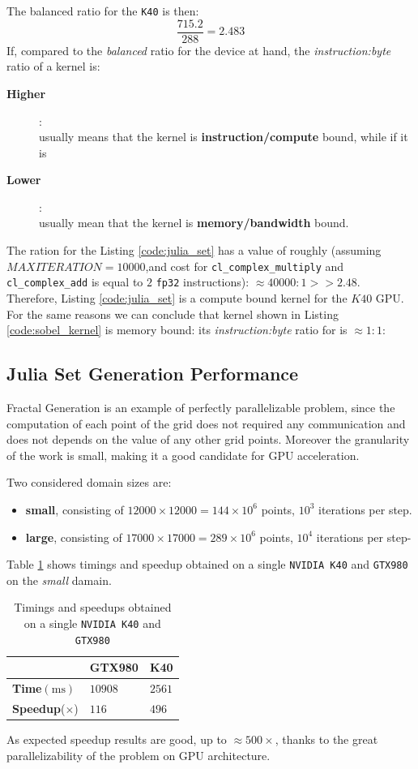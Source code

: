 The balanced ratio for the \texttt{K40} is then:\[\frac{715.2}{288} = 2.483\]
If, compared to the \textit{balanced} ratio for the device at hand, the \textit{instruction:byte} ratio of a kernel is: 
\begin{description}
	\item[\textbf{Higher}]:\\usually means that the kernel is \textbf{instruction/compute} bound, while if it is
	\item[\textbf{Lower}]:\\usually mean that the kernel is \textbf{memory/bandwidth} bound.
\end{description}

The ration for the Listing \ref{code:julia_set} has a value of roughly (assuming $MAXITERATION=10000$,and cost for \texttt{cl\_complex\_multiply} and \texttt{cl\_complex\_add} is equal to $2$ \texttt{fp32} instructions): $\approx 40000:1 >> 2.48$. Therefore, Listing \ref{code:julia_set} is a compute bound kernel for the $K40$ GPU.
For the same reasons we can conclude that kernel shown in Listing  \ref{code:sobel_kernel} is memory bound: its \textit{instruction:byte} ratio for is $\approx 1:1$:  

\subsection{Julia Set Generation Performance}
Fractal Generation is an example of perfectly parallelizable problem, since the computation of each point of the grid does not required any communication and does not depends on the value of any other grid points. Moreover the granularity of the work is small, making it a good candidate for GPU acceleration.

Two considered domain sizes are:
	\begin{itemize}
		\item \textbf{small}, consisting of  $12000 \times 12000 = 144 \times 10^6$ points, $10^3$ iterations per step.
		\item \textbf{large}, consisting of $17000 \times 17000 = 289 \times 10^6$ points, $10^4$ iterations per step-
	\end{itemize}

Table \ref{tab:julia_single_GPU} shows timings and speedup obtained on a single \texttt{NVIDIA K40} and \texttt{GTX980} on the \textit{small} damain.
\begin{table}[]
	\centering
	\caption{Timings and speedups obtained on a single \texttt{NVIDIA K40} and \texttt{GTX980}}
	\label{tab:julia_single_GPU}
\begin{tabular}{@{}lll@{}}
	\toprule
	& GTX980 & K40 \\ \midrule
	\textbf{Time}$(\si{\milli\second})$    & $10908$      & $2561$   \\
	\textbf{Speedup}($\times$) & $116$      & $496$  \\
	\bottomrule
\end{tabular}
\end{table}
As expected speedup results are good, up to $\approx 500 \times$, thanks to the great parallelizability of the problem on GPU architecture.

